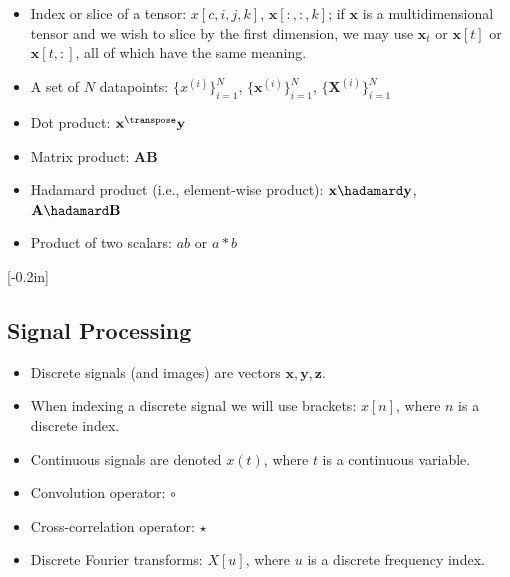 \begin{itemize}
{{}
}[-0.05in]
\item Index or slice of a tensor: $x[c,i,j,k]$, $\mathbf{x}[:,:,k]$; if $\mathbf{x}$ is a multidimensional tensor and we wish to slice by the first dimension, we may use $\mathbf{x}_t$ or $\mathbf{x}[t]$ or $\mathbf{x}[t,:]$, all of which have the same meaning.
\item A set of $N$ datapoints: $\{x^{(i)}\}_{i=1}^N$, $\{\mathbf{x}^{(i)}\}_{i=1}^N$, $\{\mathbf{X}^{(i)}\}_{i=1}^N$
\item Dot product: $\mathbf{x}^\transpose\mathbf{y}$
\item Matrix product: $\mathbf{A}\mathbf{B}$
\item Hadamard product (i.e., element-wise product): $\mathbf{x} \hadamard \mathbf{y}$, $\mathbf{A} \hadamard \mathbf{B}$
\item Product of two scalars: $ab$ or $a*b$ 
\end{itemize}
[-0.2in]


\subsection*{Signal Processing}
\begin{itemize}
\item Discrete signals (and images) are vectors $\mathbf{x}, \mathbf{y}, \mathbf{z}$.
\item When indexing a discrete signal we will use brackets: $x \left[ n\right]$, where $n$ is a discrete index.
\item Continuous signals are denoted $x (t)$, where $t$ is a continuous variable.
\item Convolution operator: $\circ$
\item Cross-correlation operator: $\star$
\item Discrete Fourier transforms: $X \left[ u\right]$, where $u$ is a discrete frequency index.
\end{itemize}

